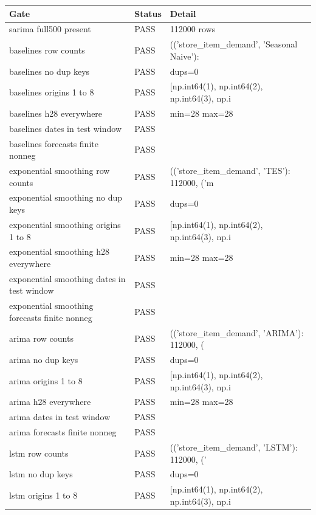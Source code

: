 {\scriptsize
\setlength\tabcolsep{4pt}
\begin{tabular}{lll}
\toprule Gate & Status & Detail \\
\midrule
sarima full500 present & PASS & 112000 rows \\
baselines row counts & PASS & (('store\_item\_demand', 'Seasonal Naive'):  \\
baselines no dup keys & PASS & dups=0 \\
baselines origins 1 to 8 & PASS & [np.int64(1), np.int64(2), np.int64(3), np.i \\
baselines h28 everywhere & PASS & min=28 max=28 \\
baselines dates in test window & PASS &  \\
baselines forecasts finite nonneg & PASS &  \\
exponential smoothing row counts & PASS & (('store\_item\_demand', 'TES'): 112000, ('m \\
exponential smoothing no dup keys & PASS & dups=0 \\
exponential smoothing origins 1 to 8 & PASS & [np.int64(1), np.int64(2), np.int64(3), np.i \\
exponential smoothing h28 everywhere & PASS & min=28 max=28 \\
exponential smoothing dates in test window & PASS &  \\
exponential smoothing forecasts finite nonneg & PASS &  \\
arima row counts & PASS & (('store\_item\_demand', 'ARIMA'): 112000, ( \\
arima no dup keys & PASS & dups=0 \\
arima origins 1 to 8 & PASS & [np.int64(1), np.int64(2), np.int64(3), np.i \\
arima h28 everywhere & PASS & min=28 max=28 \\
arima dates in test window & PASS &  \\
arima forecasts finite nonneg & PASS &  \\
lstm row counts & PASS & (('store\_item\_demand', 'LSTM'): 112000, (' \\
lstm no dup keys & PASS & dups=0 \\
lstm origins 1 to 8 & PASS & [np.int64(1), np.int64(2), np.int64(3), np.i \\
\bottomrule
\end{tabular}}
